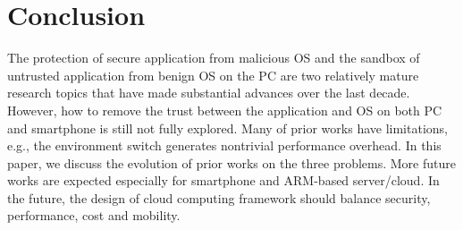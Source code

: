 \section{Conclusion}
\label{sec:conclusion}

The protection of secure application from malicious OS and the sandbox of
untrusted application from benign OS on the PC are two relatively mature
research topics that have made substantial advances over the last decade.
However, how to remove the trust between the application and OS on both PC and
smartphone is still not fully explored.  Many of prior works have limitations,
e.g., the environment switch generates nontrivial performance overhead. In this
paper, we discuss the evolution of prior works on the three problems.  More
future works are expected especially for smartphone and ARM-based server/cloud.
In the future, the design of cloud computing framework should balance security,
performance, cost and mobility.
